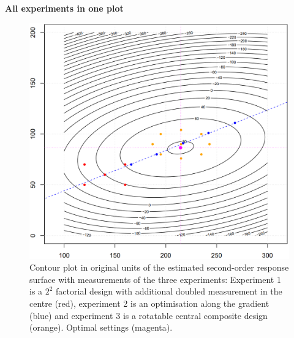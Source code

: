 \textbf{All experiments in one plot}\\
\begin{figure}[H]
  \centering
  \includegraphics[width=.8\linewidth]{Pics/15.2.3.png}
  \caption{Contour plot in original units of the estimated second-order response surface with measurements of the three experiments: Experiment 1 is a $2^2$ factorial design with additional doubled measurement in the centre (red), experiment 2 is an optimisation along the gradient (blue) and experiment 3 is a rotatable central composite design (orange). Optimal settings (magenta).}
\end{figure}
\vfill\null
\columnbreak
